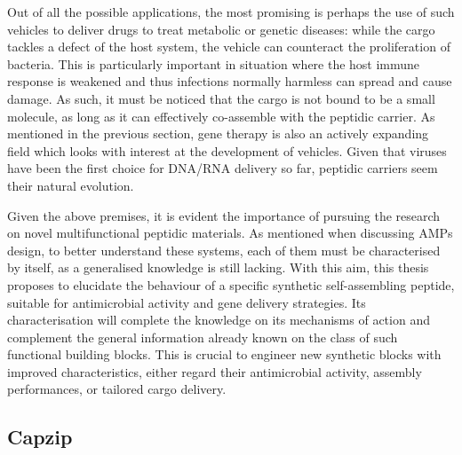 Out of all the possible applications, the most promising is perhaps the use of such vehicles to deliver drugs to treat metabolic or genetic diseases: while the cargo tackles a defect of the host system, the vehicle can counteract the proliferation of bacteria. This is particularly important in situation where the host immune response is weakened and thus infections normally harmless can spread and cause damage.
%
As such, it must be noticed that the cargo is not bound to be a small molecule, as long as it can effectively co-assemble with the peptidic carrier. As mentioned in the previous section, gene therapy is also an actively expanding field which looks with interest at the development of vehicles. Given that viruses have been the first choice for DNA/RNA delivery so far, peptidic carriers seem their natural evolution.

Given the above premises, it is evident the importance of pursuing the research on novel multifunctional peptidic materials.
%
As mentioned when discussing AMPs design, to better understand these systems, each of them must be characterised by itself, as a generalised knowledge is still lacking.
With this aim, this thesis proposes to elucidate the behaviour of a specific synthetic self-assembling peptide, suitable for antimicrobial activity and gene delivery strategies.
%
Its characterisation will complete the knowledge on its mechanisms of action and complement the general information already known on the class of such functional building blocks. This is crucial to engineer new synthetic blocks with improved characteristics, either regard their antimicrobial activity, assembly performances, or tailored cargo delivery.


\subsection{Capzip} \label{sec:capzip}

